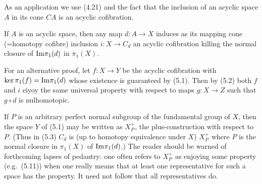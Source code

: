  
As an application we use (4.21) and the fact that the inclusion of an acyclic space $A$ in its cone
$CA$ is an acyclic cofibration.
\begin{corollary}
  If $A$ is an acyclic space, then any map $d \colon   A \longrightarrow X$ induces as its mapping cone (=homotopy cofibre) inclusion $i\colon   X \longrightarrow C_d$ an acyclic cofibration killing the normal closure of $\mathrm{Im} \pi_1(d)$ in $\pi_1(X)$.
\end{corollary}

For an alternative proof, let $f \colon   X \longrightarrow Y$ be the acyclic cofibration with $\ker \pi_1(f) = \mathrm{Im} \pi_1(d)$ whose existence is guaranteed by (5.1). Then by (5.2) both $f$ and $i$ eiyoy the same universal property with respect to maps $g \colon   X \longrightarrow  Z$ such that $g\circ d$ is nulhomotopic.

If $P$ is an arbitrary perfect normal subgroup of the fundamental group of $X$, then the space $Y$
of (5.1) may be written as $X_P^+$, the plus-construction with respect to $P$. (Thus in (5.3) $C_d$ is (up to homotopy equivalence under $X$) $X_P^+$ where $P$ is the normal closure in $\pi_1(X)$ of $\mathrm{Im} \pi_1(d)$.) The reader should be warned of forthcoming lapses of pedantry: one often refers to $X_P^+$ as enjoying some property (e.g.\  (5.11)) when one really means that at least one representative for such a space has the property. It need not follow that all representatives do.


